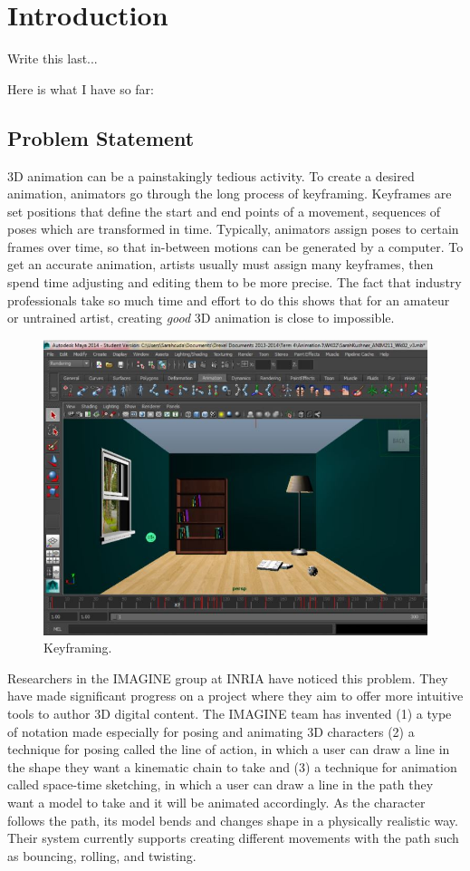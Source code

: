 \chapter{Introduction}
Write this last...

Here is what I have so far:

\section{Problem Statement}
3D animation can be a painstakingly tedious activity. To create a desired animation, animators go through the long process of keyframing. Keyframes are set positions that define the start and end points of a movement, sequences of poses which are transformed in time. Typically, animators assign poses to certain frames over time, so that in-between motions can be generated by a computer. To get an accurate animation, artists usually must assign many keyframes, then spend time adjusting and editing them to be more precise. The fact that industry professionals take so much time and effort to do this shows that for an amateur or untrained artist, creating \textit{good} 3D animation is close to impossible.

\begin{figure}
\centering
\includegraphics[scale=0.4]{img/keyframe}
\caption{Keyframing.}
\end{figure}

Researchers in the IMAGINE group at INRIA have noticed this problem. They have made significant progress on a project where they aim to offer more intuitive tools to author 3D digital content. The IMAGINE team has invented (1) a type of notation made especially for posing and animating 3D characters (2) a technique for posing called the line of action, in which a user can draw a line in the shape they want a kinematic chain to take and (3) a technique for animation called space-time sketching, in which a user can draw a line in the path they want a model to take and it will be animated accordingly. As the character follows the path, its model bends and changes shape in a physically realistic way. Their system currently supports creating different movements with the path such as bouncing, rolling, and twisting.

